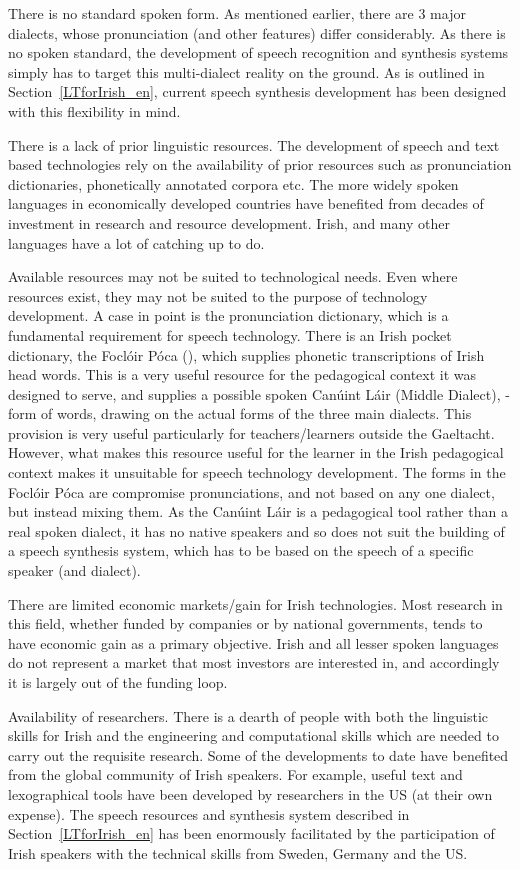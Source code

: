 \begin{multicols}{2}
There is no standard spoken form. As mentioned earlier, there are 3 major dialects, whose pronunciation (and other features) differ considerably. As there is no spoken standard, the development of speech recognition and synthesis systems simply has to target this multi-dialect reality on the ground. As is outlined in Section~\ref{LTforIrish_en}, current speech synthesis development has been designed with this flexibility in mind.

There is a lack of prior linguistic resources. The development of speech and text based technologies rely on the availability of prior resources such as pronunciation dictionaries, phonetically annotated corpora etc. The more widely spoken languages in economically developed countries have benefited from decades of investment in research and resource development. Irish, and many other languages have a lot of catching up to do.

Available resources may not be suited to technological needs. Even where resources exist, they may not be suited to the purpose of technology development. A case in point is the pronunciation dictionary, which is a fundamental requirement for speech technology. There is an Irish pocket dictionary, the Foclóir Póca (\cite{focloir}), which supplies phonetic transcriptions of Irish head words. This is a very useful resource for the pedagogical context it was designed to serve, and supplies a possible spoken Canúint Láir (Middle Dialect), - form of words, drawing on the actual forms of the three main dialects. This provision is very useful particularly for teachers/learners outside the Gaeltacht. However, what makes this resource useful for the learner in the Irish pedagogical context makes it unsuitable for speech technology development. The forms in the Foclóir Póca are compromise pronunciations, and not based on any one dialect, but instead mixing them. As the Canúint Láir is a pedagogical tool rather than a real spoken dialect, it has no native speakers and so does not suit the building of a speech synthesis system, which has to be based on the speech of a specific speaker (and dialect).

There are limited economic markets/gain for Irish technologies. Most research in this field, whether funded by companies or by national governments, tends to have economic gain as a primary objective.  Irish and all lesser spoken languages do not represent a market that most investors are interested in, and accordingly it is largely out of the funding loop.

Availability of researchers. There is a dearth of people with both the linguistic skills for Irish and the engineering and computational skills which are needed to carry out the requisite research.  Some of the developments to date have benefited from the global community of Irish speakers. For example, useful text and lexographical tools have been developed by researchers in the US (at their own expense). The speech resources and synthesis system described in Section~\ref{LTforIrish_en} has been enormously facilitated by the participation of Irish speakers with the technical skills from Sweden, Germany and the US.


\end{multicols}
